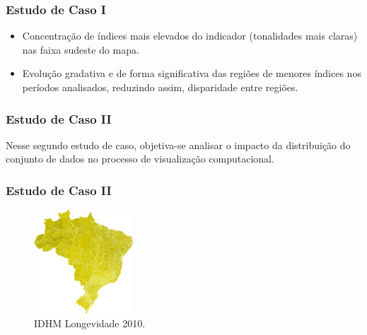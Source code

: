 \documentclass[aspectratio=169]{beamer}
\begin{document}
\begin{frame}
\frametitle{Estudo de Caso I}
\justifying

\begin{itemize}

\item Concentração de índices mais elevados do indicador (tonalidades mais claras) nas faixa sudeste do mapa.

\item Evolução gradativa e de forma significativa das regiões de menores índices nos períodos analisados, reduzindo assim, disparidade entre regiões.

\end{itemize}


\end{frame}


\begin{frame}
\frametitle{Estudo de Caso II}
\justifying

Nesse segundo estudo de caso, objetiva-se analisar o impacto da distribuição do conjunto de dados no processo de visualização computacional.


\end{frame}


\begin{frame}
\frametitle{Estudo de Caso II}
\justifying

\begin{figure}
\centering
\includegraphics[width=0.33\textwidth]{images/longevidade.png}
\caption{IDHM Longevidade 2010.}
\end{figure}

\end{frame}
\end{document}
